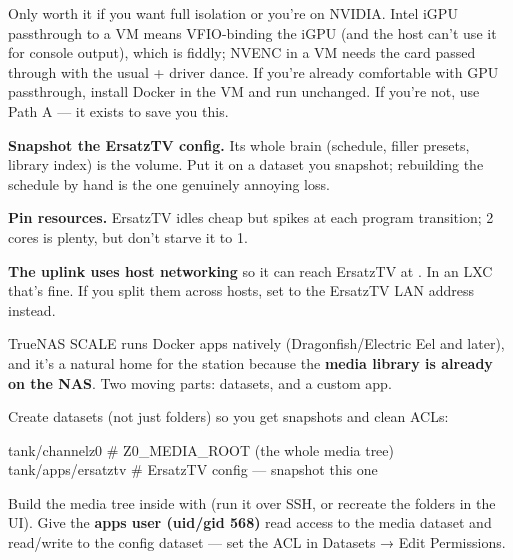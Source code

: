 \documentclass[fontpath=fonts/,logopath=logo/]{riposte-doc}
\begin{document}

Only worth it if you want full isolation or you're on NVIDIA. Intel iGPU passthrough to a VM means VFIO-binding the iGPU (and the host can't use it for console output), which is fiddly; NVENC in a VM needs the card passed through with the usual  + driver dance. If you're already comfortable with GPU passthrough, install Docker in the VM and run  unchanged. If you're not, use Path A — it exists to save you this.



\begin{ripbullets}
\item \textbf{Snapshot the ErsatzTV config.} Its whole brain (schedule, filler presets, library index) is the  volume. Put it on a dataset you snapshot; rebuilding the schedule by hand is the one genuinely annoying loss.
\item \textbf{Pin resources.} ErsatzTV idles cheap but spikes at each program transition; 2 cores is plenty, but don't starve it to 1.
\item \textbf{The uplink uses host networking} so it can reach ErsatzTV at . In an LXC that's fine. If you split them across hosts, set  to the ErsatzTV LAN address instead.
\end{ripbullets}



TrueNAS SCALE runs Docker apps natively (Dragonfish/Electric Eel and later), and it's a natural home for the station because the \textbf{media library is already on the NAS}. Two moving parts: datasets, and a custom app.



Create datasets (not just folders) so you get snapshots and clean ACLs:

\ripcodeopen
{}
\begin{ripcodeblock}
tank/channelz0            # Z0_MEDIA_ROOT  (the whole media tree)
tank/apps/ersatztv        # ErsatzTV config — snapshot this one
\end{ripcodeblock}
\ripcodesizereset\ripcodeclose

Build the media tree inside  with  (run it over SSH, or recreate the folders in the UI). Give the \textbf{apps user (uid/gid 568)} read access to the media dataset and read/write to the config dataset — set the ACL in Datasets → Edit Permissions.
\end{document}
